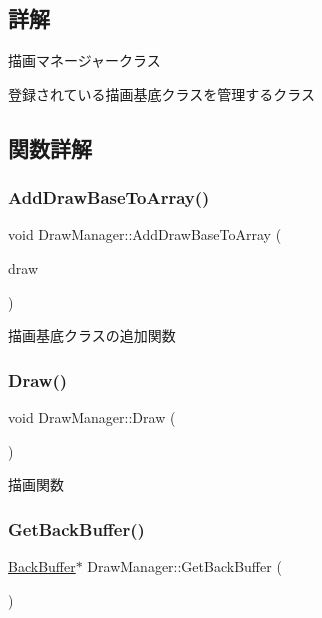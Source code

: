 \subsection{詳解}
描画マネージャークラス 

登録されている描画基底クラスを管理するクラス 

\subsection{関数詳解}
\mbox{\label{class_draw_manager_a9dbd645fdbf927cd43d400335ff9b286}} 
\subsubsection{\texorpdfstring{Add\+Draw\+Base\+To\+Array()}{AddDrawBaseToArray()}}
{\footnotesize\ttfamily void Draw\+Manager\+::\+Add\+Draw\+Base\+To\+Array (\begin{DoxyParamCaption}\item[{\mbox{\hyperlink{class_draw_base}{Draw\+Base}} $\ast$}]{draw }\end{DoxyParamCaption})}



描画基底クラスの追加関数 

\mbox{\label{class_draw_manager_a43372495e68d77a2698f211cf921b37e}} 
\subsubsection{\texorpdfstring{Draw()}{Draw()}}
{\footnotesize\ttfamily void Draw\+Manager\+::\+Draw (\begin{DoxyParamCaption}{ }\end{DoxyParamCaption})}



描画関数 

\mbox{\label{class_draw_manager_a0e7e11e650f1c1736e9d3199a58191a7}} 
\subsubsection{\texorpdfstring{Get\+Back\+Buffer()}{GetBackBuffer()}}
{\footnotesize\ttfamily \mbox{\hyperlink{class_back_buffer}{Back\+Buffer}}$\ast$ Draw\+Manager\+::\+Get\+Back\+Buffer (\begin{DoxyParamCaption}{ }\end{DoxyParamCaption})\hspace{0.3cm}{\ttfamily [inline]}}

